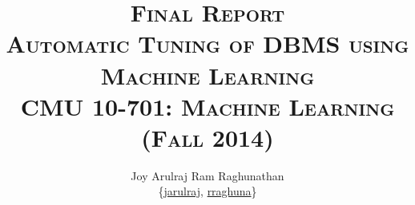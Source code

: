 \documentclass[pageno]{jpaper}
\makeatletter
\newcommand{\email}[1]{\href{mailto:#1@cs.cmu.edu}{#1}}
\makeatother
\begin{document}
\title{
  \textsc{\LARGE Final Report\\
  \Large Automatic Tuning of DBMS using Machine Learning\\
  \large CMU 10-701: Machine Learning (Fall 2014)}
}

\author{Joy Arulraj \hspace{0.1 in} Ram Raghunathan \hspace{0.1 in} \\
{\{\email{jarulraj}, \email{rraghuna}\}}}

\date{}
\maketitle










\clearpage
\balance



\end{document}
